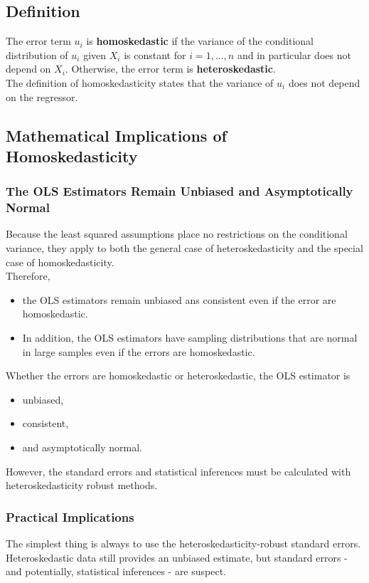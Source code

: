 \subsection{Definition}
The error term $u_{i}$ is \textbf{\color{blue}homoskedastic} if the variance of the conditional distribution of $u_{i}$ given $X_{i}$ is constant for $i = 1, ..., n$ and in particular does not depend on $X_{i}$. Otherwise, the error term is \textbf{\color{blue}heteroskedastic}.\\
The definition of homoskedasticity states that the variance of $u_{i}$ does not depend on the regressor.

\subsection{Mathematical Implications of Homoskedasticity}
\subsubsection{The OLS Estimators Remain Unbiased and Asymptotically Normal}
Because the least squared assumptions place no restrictions on the conditional variance, they apply to both the general case of heteroskedasticity and the special case of homoskedasticity.\\
Therefore,
\begin{itemize}
	\item the OLS estimators remain unbiased ans consistent even if the error are homoskedastic.
	\item In addition, the OLS estimators have sampling distributions that are normal in large samples even if the errors are homoskedastic.
\end{itemize}
Whether the errors are homoskedastic or heteroskedastic, the OLS estimator is
\begin{itemize}
	\item unbiased,
	\item consistent,
	\item and asymptotically normal.
\end{itemize}
However, the standard errors and statistical inferences must be calculated with heteroskedasticity robust methods.

\subsubsection{Practical Implications}
The simplest thing is always to use the heteroskedasticity-robust standard errors.\\
Heteroskedastic data still provides an unbiased estimate, but standard errors - and potentially, statistical inferences - are suspect.

